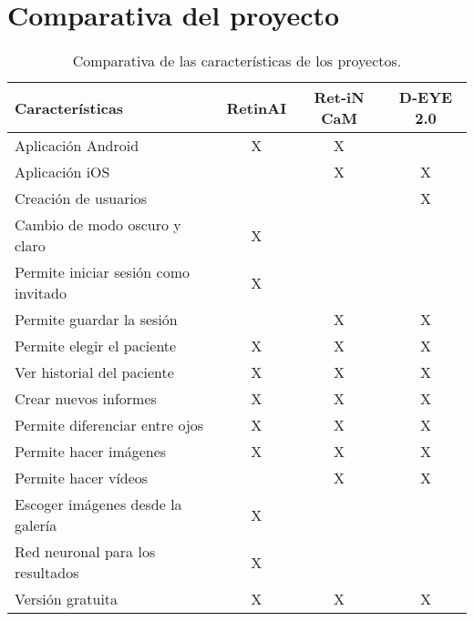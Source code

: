 \section{Comparativa del proyecto}
\begin{table}[htbp]
\centering
\begin{tabular}{lccc}
\toprule
Características & RetinAI & Ret-iN CaM & D-EYE 2.0 \\
\midrule
 
Aplicación Android & X & X & \\
Aplicación iOS & & X & X \\
Creación de usuarios  & & & X \\
Cambio de modo oscuro y claro & X & & \\
Permite iniciar sesión como invitado & X &   &   \\
Permite guardar la sesión  &  & X & X \\
Permite elegir el paciente & X & X & X \\
Ver historial del paciente & X & X & X \\
Crear nuevos informes & X & X & X \\
Permite diferenciar entre ojos  & X & X & X \\
Permite hacer imágenes & X & X & X \\
Permite hacer vídeos & & X & X \\
Escoger imágenes desde la galería & X &  & \\
Red neuronal para los resultados & X &  &  \\
Versión gratuita & X & X & X \\

\bottomrule
\end{tabular}
\caption{Comparativa de las características de los proyectos.}
\label{comparativa-proyectos}
\end{table}

